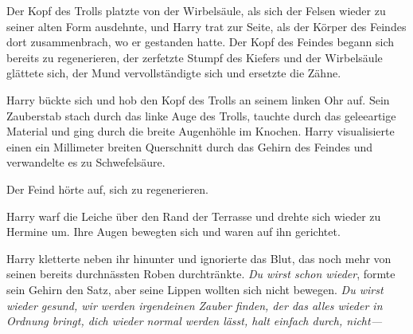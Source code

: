 

Der Kopf des Trolls platzte von der Wirbelsäule, als sich der Felsen wieder zu seiner alten Form ausdehnte, und Harry trat zur Seite, als der Körper des Feindes dort zusammenbrach, wo er gestanden hatte. Der Kopf des Feindes begann sich bereits zu regenerieren, der zerfetzte Stumpf des Kiefers und der Wirbelsäule glättete sich, der Mund vervollständigte sich und ersetzte die Zähne.

Harry bückte sich und hob den Kopf des Trolls an seinem linken Ohr auf. Sein Zauberstab stach durch das linke Auge des Trolls, tauchte durch das geleeartige Material und ging durch die breite Augenhöhle im Knochen. Harry visualisierte einen ein Millimeter breiten Querschnitt durch das Gehirn des Feindes und verwandelte es zu Schwefelsäure.

Der Feind hörte auf, sich zu regenerieren.


Harry warf die Leiche über den Rand der Terrasse und drehte sich wieder zu Hermine um. Ihre Augen bewegten sich und waren auf ihn gerichtet.

Harry kletterte neben ihr hinunter und ignorierte das Blut, das noch mehr von seinen bereits durchnässten Roben durchtränkte.
\emph{Du wirst schon wieder}, formte sein Gehirn den Satz, aber seine Lippen wollten sich nicht bewegen. \emph{Du wirst wieder gesund, wir werden irgendeinen Zauber finden, der das alles wieder in Ordnung bringt, dich wieder normal werden lässt, halt einfach durch, nicht—}

